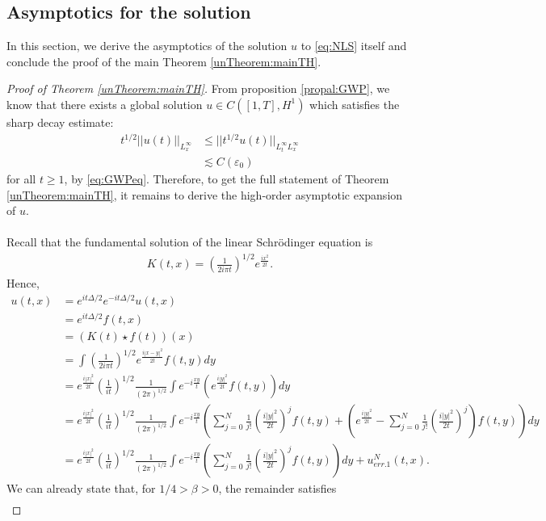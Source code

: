 \documentclass[a4paper, 15pt]{article}
\numberwithin{equation}{section}
\begin{document}
\subsection{Asymptotics for the solution}
\label{subsection:asymptoticsolut}
In this section, we derive the asymptotics of the solution $u$ to \eqref{eq:NLS} itself and conclude the proof of the main Theorem \ref{unTheorem:mainTH}. 
\begin{proof}[Proof of Theorem \ref{unTheorem:mainTH}]
From proposition \ref{propal:GWP}, we know that there exists a global solution $u\in C([1,T],H^1)$ which satisfies the sharp decay estimate:
\begin{align*}
t^{1/2}||u(t)||_{L^\infty_x}&\leq ||t^{1/2}u(t)||_{L^\infty_t L^\infty_x}\\
&\lesssim C(\varepsilon_0)
\end{align*}
for all $t\geq 1$, by \eqref{eq:GWPeq}. Therefore, to get the full statement of Theorem \ref{unTheorem:mainTH}, it remains to derive the high-order asymptotic expansion of $u$. \\\\
Recall that the fundamental solution of the linear Schrödinger equation is
\begin{align}
K(t,x)=\left(\frac{1}{2i\pi t}\right)^{1/2}e^{\frac{ix^2}{2t}}.
\end{align}
Hence,
\begin{align*}
u(t,x)&=e^{it\Delta/2}e^{-it\Delta/2}u(t,x)\\
&=e^{it\Delta/2}f(t,x)\\
&=(K(t)\star f(t))(x)\\
&=\int \left(\frac{1}{2i\pi t}\right)^{1/2}e^{\frac{i|x-y|^2}{2t}} f(t,y)dy\\
&=e^{\frac{i|x|^2}{2t}}\left(\frac{1 }{i t}\right)^{1/2}\frac{1}{(2\pi)^{1/2}}\int e^{-i\frac{xy}{t}}( e^{\frac{i|y|^2}{2t}}  f(t,y))dy\\
&=e^{\frac{i|x|^2}{2t}}\left(\frac{1 }{i t}\right)^{1/2}\frac{1}{(2\pi)^{1/2}}\int e^{-i\frac{xy}{t}}(\sum_{j=0}^{N}\frac{1}{j!}\left(\frac{i|y|^2}{2t}\right)^jf(t,y)+\left(e^{\frac{i|y|^2}{2t}}-\sum_{j=0}^{N}\frac{1}{j!}\left(\frac{i|y|^2}{2t}\right)^j\right)f(t,y))dy\\
&=e^{\frac{i|x|^2}{2t}}\left(\frac{1 }{i t}\right)^{1/2}\frac{1}{(2\pi)^{1/2}}\int e^{-i\frac{xy}{t}}(\sum_{j=0}^{N}\frac{1}{j!}\left(\frac{i|y|^2}{2t}\right)^jf(t,y))dy+u_{err.1}^N(t,x).
\end{align*}
We can already state that, for $1/4>\beta>0$, the remainder satisfies  
\begin{align*}

\end{align*}
\end{proof}
\end{document}
